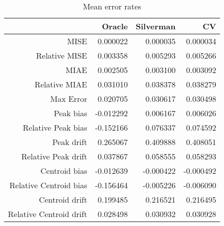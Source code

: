 \begin{table}[ht]
\centering
\begin{tabular}{rrrr}
  \hline
 & Oracle & Silverman & CV \\ 
  \hline
MISE & 0.000022 & 0.000035 & 0.000034 \\ 
  Relative MISE & 0.003358 & 0.005293 & 0.005266 \\ 
  MIAE & 0.002505 & 0.003100 & 0.003092 \\ 
  Relative MIAE & 0.031010 & 0.038378 & 0.038279 \\ 
  Max Error & 0.020705 & 0.030617 & 0.030498 \\ 
  Peak bias & -0.012292 & 0.006167 & 0.006026 \\ 
  Relative Peak bias & -0.152166 & 0.076337 & 0.074592 \\ 
  Peak drift & 0.265067 & 0.409888 & 0.408051 \\ 
  Relative Peak drift & 0.037867 & 0.058555 & 0.058293 \\ 
  Centroid bias & -0.012639 & -0.000422 & -0.000492 \\ 
  Relative Centroid bias & -0.156464 & -0.005226 & -0.006090 \\ 
  Centroid drift & 0.199485 & 0.216521 & 0.216495 \\ 
  Relative Centroid drift & 0.028498 & 0.030932 & 0.030928 \\ 
   \hline
\end{tabular}
\caption{Mean error rates} 
\label{tbl:mean_error_rates}
\end{table}
